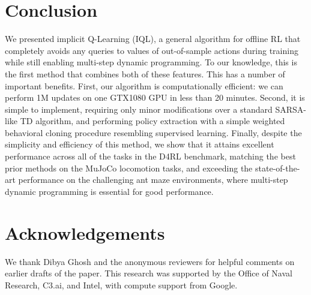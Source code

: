 \documentclass{article} %
\def\ourname{IQL\xspace}
\begin{document}
\vspace{-0.2cm}
\section{Conclusion}
\vspace{-0.2cm}

We presented implicit Q-Learning (\ourname), a general algorithm for offline RL that completely avoids any queries to values of out-of-sample actions during training while still enabling multi-step dynamic programming. To our knowledge, this is the first method that combines both of these features. This has a number of important benefits. First, our algorithm is computationally efficient: we can perform 1M updates on one GTX1080 GPU in less than 20 minutes. Second, it is simple to implement, requiring only minor modifications over a standard SARSA-like TD algorithm, and performing policy extraction with a simple weighted behavioral cloning procedure resembling supervised learning. 
Finally, despite the simplicity and efficiency of this method, we show that it attains excellent performance across all of the tasks in the D4RL benchmark, matching the best prior methods on the MuJoCo locomotion tasks, and exceeding the state-of-the-art performance on the challenging ant maze environments, where multi-step dynamic programming is essential for good performance.

\newpage
\section*{Acknowledgements}
We thank Dibya Ghosh and the anonymous reviewers for helpful comments on earlier drafts of the paper.
This research was supported by the Office of Naval Research, C3.ai, and Intel, with compute support from Google. 
\end{document}

